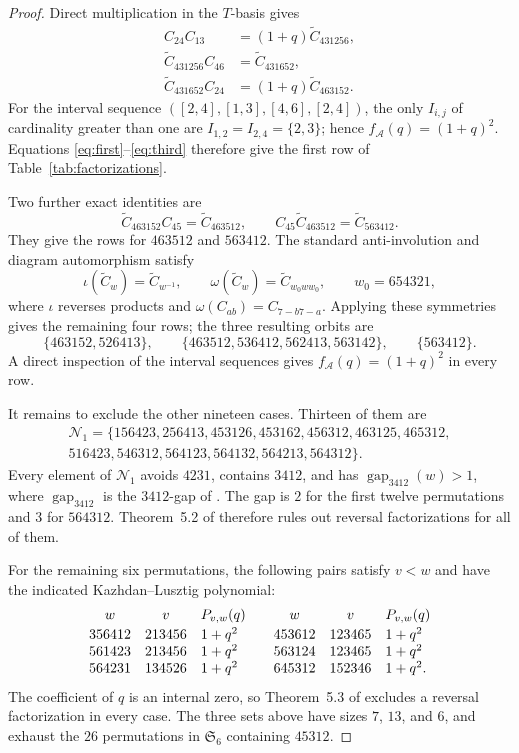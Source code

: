 \documentclass[10pt]{amsart}
\theoremstyle{remark}
\newcommand{\Ssix}{\mathfrak S_6}
\newcommand{\Ct}{\widetilde C}
\newcommand{\Cab}[2]{C_{#1#2}}
\newcommand{\gap}{\operatorname{gap}_{3412}}
\begin{document}
\begin{proof}
Direct multiplication in the $T$-basis gives
\begin{align}
\Cab{2}{4}\Cab{1}{3}
  &=(1+q)\Ct_{431256},\label{eq:first}\\
\Ct_{431256}\Cab{4}{6}
  &=\Ct_{431652},\label{eq:second}\\
\Ct_{431652}\Cab{2}{4}
  &=(1+q)\Ct_{463152}.
\label{eq:third}
\end{align}
For the interval sequence
$([2,4],[1,3],[4,6],[2,4])$, the only $I_{i,j}$ of cardinality greater
than one are
$I_{1,2}=I_{2,4}=\{2,3\}$; hence
$f_{\mathcal A}(q)=(1+q)^2$. Equations
\eqref{eq:first}--\eqref{eq:third} therefore give the first row of
Table~\ref{tab:factorizations}.

Two further exact identities are
\[
\Ct_{463152}\Cab{4}{5}=\Ct_{463512},
\qquad
\Cab{4}{5}\Ct_{463512}=\Ct_{563412}.
\]
They give the rows for $463512$ and $563412$. The standard
anti-involution and diagram automorphism satisfy
\[
\iota(\Ct_w)=\Ct_{w^{-1}},
\qquad
\omega(\Ct_w)=\Ct_{w_0ww_0},
\qquad w_0=654321,
\]
where $\iota$ reverses products and
$\omega(\Cab{a}{b})=\Cab{7-b}{7-a}$. Applying these symmetries gives
the remaining four rows; the three resulting orbits are
\[
\{463152,526413\},\qquad
\{463512,536412,562413,563142\},\qquad
\{563412\}.
\]
A direct inspection of the interval sequences gives
$f_{\mathcal A}(q)=(1+q)^2$ in every row.

It remains to exclude the other nineteen cases. Thirteen of them are
\begin{multline*}
\mathcal N_1=\{156423,256413,453126,453162,456312,463125,465312,\\
516423,546312,564123,564132,564213,564312\}.
\end{multline*}
Every element of $\mathcal N_1$ avoids $4231$, contains $3412$, and has
$\gap(w)>1$, where $\gap$ is the $3412$-gap of
\cite[Sec.~5]{ParisiEtAl}. The gap is $2$ for the first twelve
permutations and $3$ for $564312$. Theorem~5.2 of
\cite{ParisiEtAl} therefore rules out reversal factorizations for all
of them.

For the remaining six permutations, the following pairs satisfy
$v<w$ and have the indicated Kazhdan--Lusztig polynomial:
\[
\begin{array}{ccl@{\qquad}ccl}
 w&v&P_{v,w}(q)&w&v&P_{v,w}(q)\\[2pt]
356412&213456&1+q^2&453612&123465&1+q^2\\
561423&213456&1+q^2&563124&123465&1+q^2\\
564231&134526&1+q^2&645312&152346&1+q^2.
\end{array}
\]
The coefficient of $q$ is an internal zero, so Theorem~5.3 of
\cite{ParisiEtAl} excludes a reversal factorization in every case.
The three sets above have sizes $7$, $13$, and $6$, and exhaust the
$26$ permutations in $\Ssix$ containing $45312$.


\end{proof}
\end{document}
